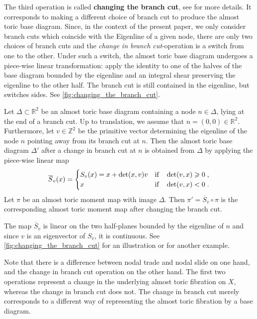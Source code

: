 \documentclass[12pt,a4paper,draft]{scrartcl}
\begin{document}
The third operation is called \textbf{changing the branch cut}, see \cite[Sections 8.4]{evans2021atfs} for more details.
It corresponds to making a different choice of branch cut to produce the almost toric base diagram.
Since, in the context of the present paper, we only consider branch cuts which coincide with the Eigenline of a given node, there are only two choices of branch cuts and the \textit{change in branch cut}-operation is a switch from one to the other.
Under such a switch, the almost toric base diagram undergoes a piece-wise linear transformation: apply the identity to one of the halves of the base diagram bounded by the eigenline and an integral shear preserving the eigenline to the other half.
The branch cut is still contained in the eigenline, but switches sides. See \cref{fig:changing_the_branch_cut}.

\begin{proposition}
    \label{thm:change_branchcut}
    Let $\Delta \subset \mathbb{R}^2$ be an almost toric base diagram containing a node $n \in \Delta$, lying at the end of a branch cut.
Up to translation, we assume that $n = (0,0) \in \mathbb{R}^2$.
Furthermore, let $v \in \mathbb{Z}^2$ be the primitive vector determining the eigenline of the node $n$ pointing away from its branch cut at $n$.
Then the almost toric base diagram $\Delta'$ after a change in branch cut at $n$ is obtained from $\Delta$ by applying the piece-wise linear map 
    \begin{equation}
    \label{eq:half-shear}
        \overline{S}_v(x) =
        \begin{cases}
            S_v(x) = x + \det(x,v)v & \qif* \det(v,x) \geqslant 0 \;, \\
            x & \qif* \det(v,x) < 0 \;.
        \end{cases}
    \end{equation}
    Let $\pi$ be an almost toric moment map with image $\Delta$.
Then $\pi' = \overline{S}_v \circ \pi$ is the corresponding almost toric moment map after changing the branch cut.
\end{proposition}

The map $\overline{S}_v$ is linear on the two half-planes bounded by the eigenline of $n$ and since $v$ is an eigenvector of $S_v$, it is continuous.
See \cref{fig:changing_the_branch_cut} for an illustration or \cite[Example 8.15]{evans2021atfs} for another example.

Note that there is a difference between nodal trade and nodal slide on one hand, and the change in branch cut operation on the other hand.
The first two operations represent a change in the underlying almost toric fibration on $X$, whereas the change in branch cut does not.
The change in branch cut merely corresponds to a different way of representing the almost toric fibration by a base diagram.
\end{document}
